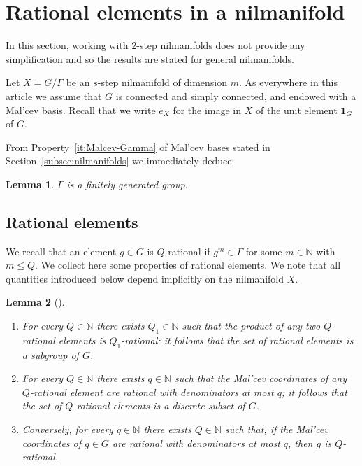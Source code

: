 \documentclass[11pt]{amsart}
\newtheorem{lemma}{Lemma}[section]
\theoremstyle{definition}
\begin{document}
 \appendix
\section{Rational elements in a  nilmanifold}
\label{ap:A}
In this section, working with  $2$-step nilmanifolds does
not provide any simplification and so the results are stated for
general nilmanifolds.

Let $X=G/\Gamma$ be an $s$-step nilmanifold of dimension $m$. As
everywhere in this article we assume that $G$ is connected and
simply connected, and endowed with a Mal'cev basis. Recall that we
write $e_X$ for the image in $X$ of the unit element  ${\mathbf{1}}_G$ of
$G$.

From  Property~\eqref{it:Malcev-Gamma} of Mal'cev bases stated in
Section~\ref{subsec:nilmanifolds} we immediately deduce:
\begin{lemma}
\label{lem:finite-Gamma}
 $\Gamma$ is a finitely generated group.
\end{lemma}

\subsection{Rational elements}
We recall that an element $g\in G$ is $Q$-rational if
$g^m\in\Gamma$ for some  $m\in {{\mathbb N}}$ with $ m\leq Q$.
 We collect here some properties of rational elements. We note that all quantities  introduced  below depend implicitly on the nilmanifold $X$.
\begin{lemma}[{\cite[Lemma A.11]{GT12a}}]
\label{lem:rational}
\begin{enumerate}
\item
\label{it:rat1} For every $Q\in{{\mathbb N}}$ there exists $Q_1\in{{\mathbb N}}$ such that
the product of any two $Q$-rational elements is $Q_1$-rational; it
follows  that the set of rational elements is a subgroup of $G$.

\item
\label{it:rat2}
For every $Q\in {{\mathbb N}}$ there exists $q\in{{\mathbb N}}$ such that the Mal'cev coordinates of any $Q$-rational element are rational with denominators at most $q$; it follows that the set of $Q$-rational elements is a discrete subset of $G$.
\item
\label{it:rat3}
Conversely, for every $q\in{{\mathbb N}}$ there exists $Q\in{{\mathbb N}}$ such that, if the  Mal'cev coordinates of $g\in G$  are rational with denominators at most $q$, then $g$ is $Q$-rational.
\end{enumerate}
\end{lemma}
\end{document}
